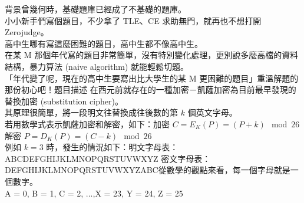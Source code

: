 背景曾幾何時，基礎題庫已經成了不基礎的題庫。\\
小小新手們寫個題目，不少拿了 TLE、CE 求助無門，就再也不想打開 Zerojudge。\\
高中生哪有寫這麼困難的題目，高中生都不像高中生。\\
在某 M 那個年代寫的題目非常簡單，沒有特別變化處理，更別說多麼高檔的資料結構，暴力算法 (naive algorithm) 就能輕鬆切題。\\
「年代變了呢，現在的高中生要寫出比大學生的某 M 更困難的題目」重溫解題的那份初心吧！題目描述 在西元前就存在的一種加密－凱薩加密為目前最早發現的替換加密 (substitution cipher)。\\
其原理很簡單，將一段明文往替換成往後數的第 $k$ 個英文字母。\\
若用數學式表示凱薩加密和解密，如下：加密 $C = E_K(P) = (P + k) \mod 26$解密 $P = D_K(P) = (C - k) \mod 26$\\
 例如 $k = 3$ 時，發生的情況如下：明文字母表：ABCDEFGHIJKLMNOPQRSTUVWXYZ 密文字母表：DEFGHIJKLMNOPQRSTUVWXYZABC從數學的觀點來看，每一個字母就是一個數字。\\
A = 0, B = 1, C = 2, ...,X = 23, Y = 24, Z = 25